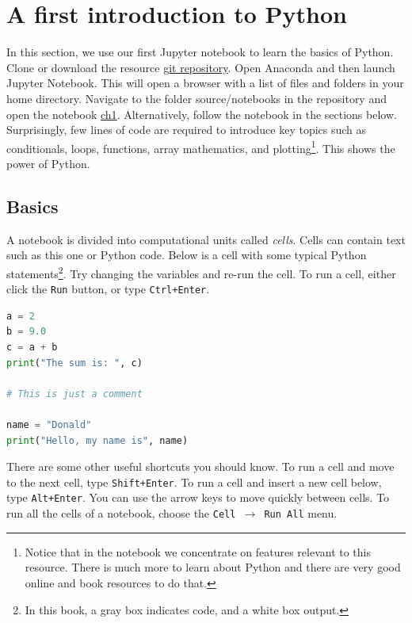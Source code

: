 \documentclass[a4paper , 12pt]{book}
\newcommand{\code}[1]{\colorbox{light-gray}{\texttt{#1}}}
\begin{document}
\section{A first introduction to Python}

In this section, we use our first Jupyter notebook to learn the basics of Python. Clone or download the resource \href{https://github.com/nfcd/compGeo}{git repository}. Open Anaconda and then launch Jupyter Notebook. This will open a browser with a list of files and folders in your home directory. Navigate to the folder source/notebooks in the repository and open the notebook \href{https://github.com/nfcd/compGeo/blob/master/source/notebooks/ch1.ipynb}{ch1}. Alternatively, follow the notebook in the sections below. Surprisingly, few lines of code are required to introduce key topics such as conditionals, loops, functions, array mathematics, and plotting\footnote{Notice that in the notebook we concentrate on features relevant to this resource. There is much more to learn about Python and there are very good online and book resources to do that.}. This shows the power of Python.

\subsection{Basics}

A notebook is divided into computational units called \textit{cells}. Cells can contain text such as this one or Python code. Below is a cell with some typical Python statements\footnote{In this book, a gray box indicates code, and a white box output.}. Try changing the variables and re-run the cell. To run a cell, either click the \code{Run} button, or type \code{Ctrl+Enter}.

\begin{center}
\begin{lstlisting}[language=Python, frame=single]
a = 2
b = 9.0
c = a + b
print("The sum is: ", c)

# This is just a comment

name = "Donald"
print("Hello, my name is", name)
\end{lstlisting}
\end{center}

There are some other useful shortcuts you should know. To run a cell and move to the next cell, type \code{Shift+Enter}. To run a cell and insert a new cell below, type \code{Alt+Enter}. You can use the arrow keys to move quickly between cells. To run all the cells of a notebook, choose the \code{Cell $\rightarrow$ Run All} menu.
\end{document}
